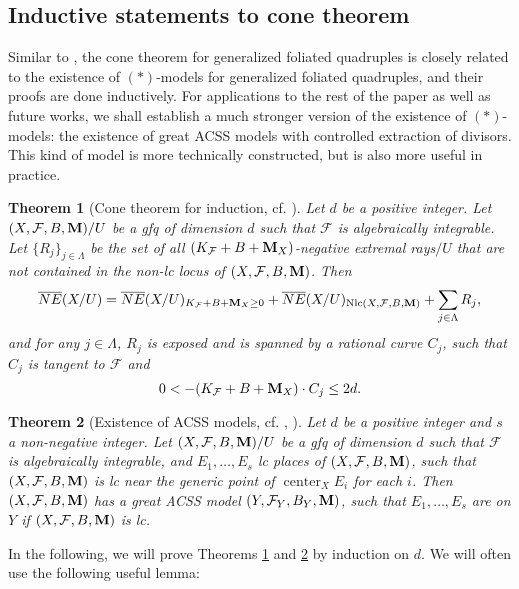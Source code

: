 \documentclass[11pt]{amsart}
\numberwithin{equation}{section}
\newcommand{\Mm}{{\bf{M}}}
\newcommand{\Center}{\operatorname{center}}
\newcommand{\Nlc}{\operatorname{Nlc}}
\newcommand{\Ff}{\mathcal{F}}
\newtheorem{thm}{Theorem}[subsection]
\theoremstyle{definition}
\theoremstyle{definition}
\theoremstyle{definition}
\begin{document}
\subsection{Inductive statements to cone theorem}

Similar to \cite[Theorems 3.9, 3.10]{ACSS21}, the cone theorem for generalized foliated quadruples is closely related to the existence of $(*)$-models for generalized foliated quadruples, and their proofs are done inductively. For applications to the rest of the paper as well as future works, we shall establish a much stronger version of the existence of $(*)$-models: the existence of great ACSS models with controlled extraction of divisors. This kind of model is more technically constructed, but is also more useful in practice.

\begin{thm}[Cone theorem for induction, cf. {\cite[Theorem 3.9]{ACSS21}}]\label{thm: cone theorem induction}
Let $d$ be a positive integer. Let $(X,\Ff,B,\Mm)/U$ be a gfq of dimension $d$ such that $\Ff$ is algebraically integrable. Let $\{R_j\}_{j\in\Lambda}$ be the set of all $(K_{\Ff}+B+\Mm_X)$-negative extremal rays$/U$ that are not contained in the non-lc locus of $(X,\Ff,B,\Mm)$. Then
$$\overline{NE}(X/U)=\overline{NE}(X/U)_{K_{\Ff}+B+\Mm_X\geq 0}+\overline{NE}(X/U)_{\Nlc(X,\Ff,B,\Mm)}+\sum_{j\in\Lambda} R_j,$$
and for any $j\in\Lambda$, $R_j$ is exposed and is spanned by a rational curve $C_j$, such that $C_j$ is tangent to $\Ff$ and $$0<-(K_{\Ff}+B+\Mm_X)\cdot C_j\leq 2d.$$
\end{thm}

\begin{thm}[Existence of ACSS models, cf. {\cite[Theorem 3.10]{ACSS21}, \cite[Proposition 4.14]{DLM23}}]\label{thm: property * induction}
Let $d$ be a positive integer and $s$ a non-negative integer. Let $(X,\Ff,B,\Mm)/U$ be a gfq of dimension $d$ such that $\Ff$ is algebraically integrable, and $E_1,\dots,E_s$ lc places of $(X,\Ff,B,\Mm)$, such that $(X,\Ff,B,\Mm)$ is lc near the generic point of $\Center_X{E_i}$ for each $i$. Then $(X,\Ff,B,\Mm)$ has a great ACSS model $(Y,\Ff_Y,B_Y,\Mm)$, such that $E_1,\dots,E_s$ are on $Y$ if $(X,\Ff,B,\Mm)$ is lc.
\end{thm}

In the following, we will prove Theorems \ref{thm: cone theorem induction} and \ref{thm: property * induction} by induction on $d$. We will often use the following useful lemma:
\end{document}
